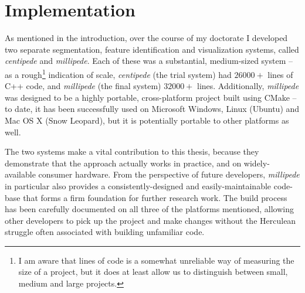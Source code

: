\section{Implementation}

\enlargethispage*{\baselineskip}

As mentioned in the introduction, over the course of my doctorate I developed two separate segmentation, feature identification and visualization systems, called \emph{centipede} and \emph{millipede}. Each of these was a substantial, medium-sized system -- as a rough\footnote{I am aware that lines of code is a somewhat unreliable way of measuring the size of a project, but it does at least allow us to distinguish between small, medium and large projects.} indication of scale, \emph{centipede} (the trial system) had $26000+$ lines of C++ code, and \emph{millipede} (the final system) $32000+$ lines. Additionally, \emph{millipede} was designed to be a highly portable, cross-platform project built using CMake -- to date, it has been successfully used on Microsoft Windows, Linux (Ubuntu) and Mac OS X (Snow Leopard), but it is potentially portable to other platforms as well.

The two systems make a vital contribution to this thesis, because they demonstrate that the approach actually works in practice, and on widely-available consumer hardware. From the perspective of future developers, \emph{millipede} in particular also provides a consistently-designed and easily-maintainable code-base that forms a firm foundation for further research work. The build process has been carefully documented on all three of the platforms mentioned, allowing other developers to pick up the project and make changes without the Herculean struggle often associated with building unfamiliar code.

